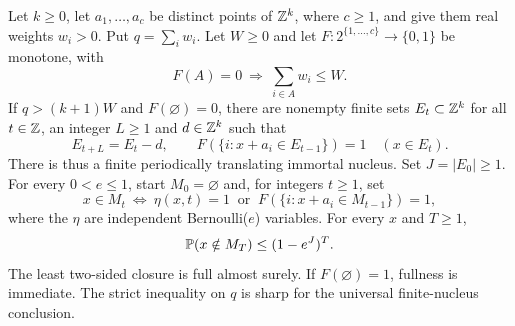 \begin{theorem}\label{ld:saturation}
Let $k\ge0$, let $a_1,\ldots,a_c$ be distinct points of $\mathbb{Z}^k$, where $c\ge1$, and give them real weights $w_i>0$. Put $q=\sum_iw_i$. Let $W\ge0$ and let $F:2^{\{1,\ldots,c\}}\to\{0,1\}$ be monotone, with
\[
 F(A)=0\ \Longrightarrow\ \sum_{i\in A}w_i\le W.
\]
If $q>(k+1)W$ and $F(\varnothing)=0$, there are nonempty finite sets $E_t\subset\mathbb{Z}^k$ for all $t\in\mathbb{Z}$, an integer $L\ge1$ and $d\in\mathbb{Z}^k$ such that
\[
 E_{t+L}=E_t-d,\qquad
 F(\{i:x+a_i\in E_{t-1}\})=1\quad(x\in E_t).
\]
There is thus a finite periodically translating immortal nucleus. Set $J=|E_0|\ge1$. For every $0<e\le1$, start $M_0=\varnothing$ and, for integers $t\ge1$, set
\[
 x\in M_t\ \Longleftrightarrow\
 \eta(x,t)=1\ \text{ or }\ F(\{i:x+a_i\in M_{t-1}\})=1,
\]
where the $\eta$ are independent Bernoulli($e$) variables. For every $x$ and $T\ge1$,
\begin{equation}\label{ld:satbound}
 \mathbb{P}(x\notin M_T)\le(1-e^J)^T.
\end{equation}
The least two-sided closure is full almost surely. If $F(\varnothing)=1$, fullness is immediate. The strict inequality on $q$ is sharp for the universal finite-nucleus conclusion.
\end{theorem}
